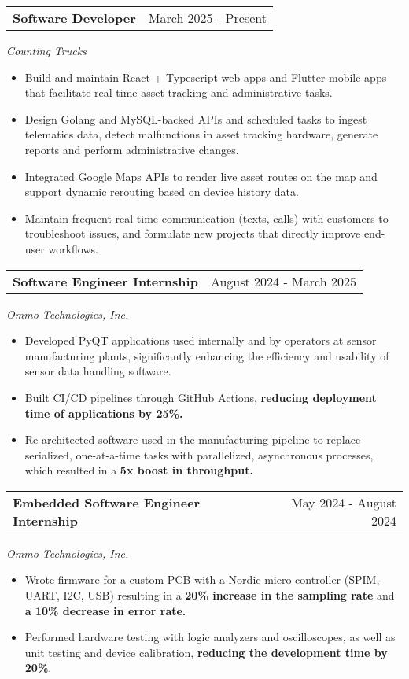 \documentclass[a4paper,12pt]{article}
\begin{document}
\begin{tabularx}{\linewidth}{@{}Xr@{}}
\textbf{Software Developer} & \hfill March 2025 - Present
\end{tabularx}
\textit{Counting Trucks}
\vspace{-0.4em}
\begin{itemize}
    \item Build and maintain React + Typescript web apps and Flutter mobile apps that facilitate real-time asset tracking and administrative tasks.
    \item Design Golang and MySQL-backed APIs and scheduled tasks to ingest telematics data, detect malfunctions in asset tracking hardware, generate reports and perform administrative changes. 
    \item Integrated Google Maps APIs to render live asset routes on the map and support dynamic rerouting based on device history data.
    \item Maintain frequent real-time communication (texts, calls) with customers to troubleshoot issues, and formulate new projects that directly improve end-user workflows.
\end{itemize}

\begin{tabularx}{\linewidth}{@{}Xr@{}}
\textbf{Software Engineer Internship} & \hfill August 2024 - March 2025
\end{tabularx}
\textit{Ommo Technologies, Inc.}
\vspace{-0.4em}
\begin{itemize}
    \item Developed PyQT applications used internally and by operators at sensor manufacturing plants, significantly enhancing the efficiency and usability of sensor data handling software.
    \item Built CI/CD pipelines through GitHub Actions, \textbf{reducing deployment time of applications by 25\%.}
    \item Re-architected software used in the manufacturing pipeline to replace serialized, one-at-a-time tasks with parallelized, asynchronous processes, which resulted in a \textbf{5x boost in throughput.}
\end{itemize}

\begin{tabularx}{\linewidth}{@{}Xr@{}}
\textbf{Embedded Software Engineer Internship} & \hfill May 2024 - August 2024
\end{tabularx}
\textit{Ommo Technologies, Inc.}
\vspace{-0.4em}
\begin{itemize}   
    \item Wrote firmware for a custom PCB with a Nordic micro-controller (SPIM, UART, I2C, USB) resulting in a \textbf{20\% increase in the sampling rate} and \textbf{a 10\% decrease in error rate.}
    \item Performed hardware testing with logic analyzers and oscilloscopes, as well as unit testing and device calibration, \textbf{ reducing the development time by 20\%}.
\end{itemize}
\end{document}
